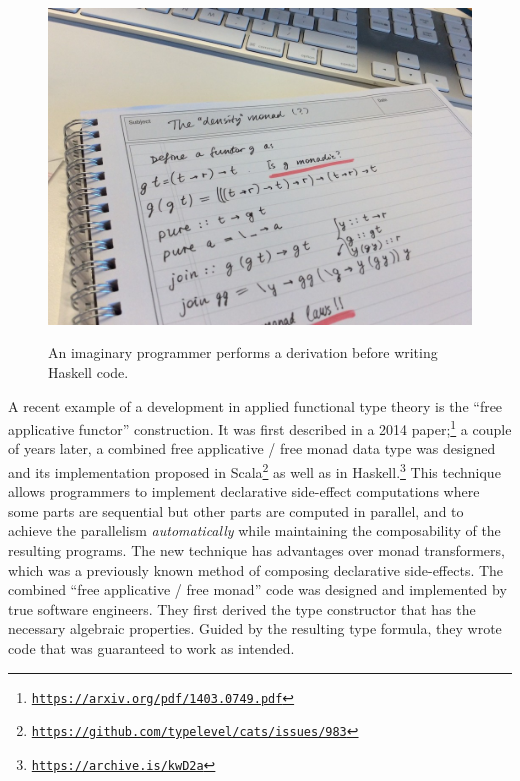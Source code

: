 \begin{figure}
\begin{centering}
{\footnotesize{}\includegraphics[width=0.6\linewidth]{ftt-example}}{\footnotesize\par}
\par\end{centering}
\caption{An imaginary programmer performs a derivation before writing Haskell
code.\label{fig:Example-calculation-in-type-theory}}

\end{figure}

A recent example of a development in applied functional type theory
is the \textsf{``}free applicative functor\textsf{''} construction. It was first described
in a 2014 paper;\footnote{\texttt{\href{https://arxiv.org/pdf/1403.0749.pdf}{https://arxiv.org/pdf/1403.0749.pdf}}}
a couple of years later, a combined free applicative / free monad
data type was designed and its implementation proposed in Scala\footnote{\texttt{\href{https://github.com/typelevel/cats/issues/983}{https://github.com/typelevel/cats/issues/983}}}
as well as in Haskell.\footnote{\texttt{\href{https://elvishjerricco.github.io/2016/04/08/applicative-effects-in-free-monads.html}{https://archive.is/kwD2a}}}
This technique allows programmers to implement declarative side-effect
computations where some parts are sequential but other parts are computed
in parallel, and to achieve the parallelism \emph{automatically} while
maintaining the composability of the resulting programs. The new technique
has advantages over monad transformers, which was a previously known
method of composing declarative side-effects. The combined \textsf{``}free
applicative / free monad\textsf{''} code was designed and implemented by true
software engineers. They first derived the type constructor that has
the necessary algebraic properties. Guided by the resulting type formula,
they wrote code that was guaranteed to work as intended.

